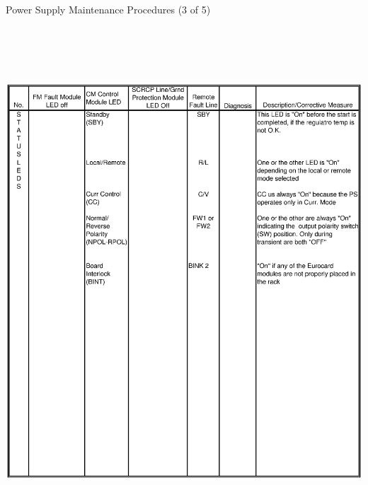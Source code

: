 \clearpage
\begin{table}
\caption{Power Supply Maintenance Procedures (3 of 5) \label{tab:ps_maint_3}}
\includegraphics[height=7.5in,width=6.2in]{spectrometers/book3.ps}
\end{table}

